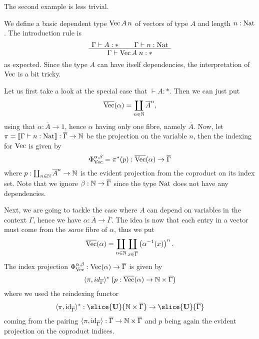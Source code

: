 \documentclass[runningheads,envcountsame,envcountsect,orivec]{llncs}
\begin{document}
The second example is less trivial.
\begin{example}
  We define a basic dependent type $\operatorname{Vec} A \, n$ of vectors of type $A$ and
  length $n : \operatorname{Nat}$.
  The introduction rule is
  \begin{equation*}
    \AxiomC{$\Gamma \vdash A : \ast$}
    \AxiomC{$\Gamma \vdash n : \NatT$}
    \BinaryInfC{$\Gamma \vdash \VecT A \; n : \ast$}
    \DisplayProof
  \end{equation*}
  as expected.
  Since the type $A$ can have itself dependencies, the interpretation of $\operatorname{Vec}$
  is a bit tricky.

  Let us first take a look at the special case that $\vdash A : \ast$.
  Then we can just put
  \begin{equation*}
    \overline{\operatorname{Vec}}(\alpha) = \coprod_{n \in \mathbb{N}} \overline{A}^n,
  \end{equation*}
  using that $\alpha : \overline{A} \to 1$, hence $\alpha$ having only one
  fibre, namely $\overline{A}$.
  Now, let $\pi = \llbracket\Gamma \vdash n : \operatorname{Nat}\rrbracket : \overline{\Gamma} \to \mathbb{N}$
  be the projection on the variable $n$, then the indexing
  for $\operatorname{Vec}$ is given by
  \begin{equation*}
    \Phi_{\operatorname{Vec}}^{\alpha,\beta} = \pi^{\ast}(p)
      : \overline{\operatorname{Vec}}(\alpha) \to \overline{\Gamma}
  \end{equation*}
  where $p : \coprod_{n \in \mathbb{N}} \overline{A}^n \to \mathbb{N}$ is the evident projection
  from the coproduct on its index set.
  Note that we ignore $\beta : \mathbb{N} \to \overline{\Gamma}$ since the type $\operatorname{Nat}$
  does not have any dependencies.

  Next, we are going to tackle the case where $A$ can depend on variables in
  the context $\Gamma$, hence we have
  $\alpha : \overline{A} \to \overline{\Gamma}$.
  The idea is now that each entry in a vector must come from the \emph{same}
  fibre of $\alpha$, thus we put
  \begin{equation*}
    \overline{\operatorname{Vec}}(\alpha) =
      \coprod_{n \in \mathbb{N}}
      \coprod_{x \in \overline{\Gamma}}
      \left( \alpha^{-1}(x) \right)^n.
  \end{equation*}
  The index projection
  $\Phi_{\operatorname{Vec}}^{\alpha,\beta} : \operatorname{Vec} (\alpha) \to \overline{\Gamma}$ is
  given by
  \begin{equation*}
    \langle \pi,id_{\overline{\Gamma}} \rangle^\ast
    \left(p :  \overline{\operatorname{Vec}}(\alpha) \to \mathbb{N} \times \overline{\Gamma}\right)
  \end{equation*}
  where we used the reindexing functor
  \begin{equation*}
    \prodArr{\pi,\id_{\overline{\Gamma}}}^{\ast} :
      \slice{\Cat{U}}{\N \times \overline{\Gamma}} \to
      \slice{\Cat{U}}{\overline{\Gamma}}
  \end{equation*}
  coming from the pairing
  $\langle \pi,\operatorname{id}_{\overline{\Gamma}} \rangle :
  \overline{\Gamma} \to \mathbb{N} \times \overline{\Gamma}$
  and $p$ being again the evident projection on the coproduct indices.


\end{example}
\end{document}
